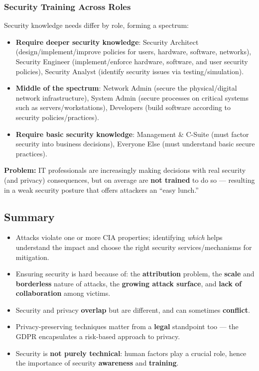 \documentclass[12pt, a4paper]{article}
\begin{document}
\subsubsection{Security Training Across Roles}
Security knowledge needs differ by role, forming a spectrum:
\begin{itemize}
    \item \textbf{Require deeper security knowledge}: Security Architect (design/implement/improve policies for users, hardware, software, networks), Security Engineer (implement/enforce hardware, software, and user security policies), Security Analyst (identify security issues via testing/simulation).
    \item \textbf{Middle of the spectrum}: Network Admin (secure the physical/digital network infrastructure), System Admin (secure processes on critical systems such as servers/workstations), Developers (build software according to security policies/practices).
    \item \textbf{Require basic security knowledge}: Management \& C-Suite (must factor security into business decisions), Everyone Else (must understand basic secure practices).
\end{itemize}

\textcolor{red!70!black}{\textbf{Problem:}} IT professionals are increasingly making decisions with real security (and privacy) consequences, but on average are \textbf{not trained} to do so — resulting in a weak security posture that offers attackers an ``easy lunch.''

\subsection{Summary}
\begin{itemize}
    \item Attacks violate one or more CIA properties; identifying \emph{which} helps understand the impact and choose the right security services/mechanisms for mitigation.
    \item Ensuring security is hard because of: the \textbf{attribution} problem, the \textbf{scale} and \textbf{borderless} nature of attacks, the \textbf{growing attack surface}, and \textbf{lack of collaboration} among victims.
    \item Security and privacy \textbf{overlap} but are different, and can sometimes \textbf{conflict}.
    \item Privacy-preserving techniques matter from a \textbf{legal} standpoint too — the GDPR encapsulates a risk-based approach to privacy.
    \item Security is \textbf{not purely technical}: human factors play a crucial role, hence the importance of security \textbf{awareness} and \textbf{training}.
\end{itemize}
\end{document}
